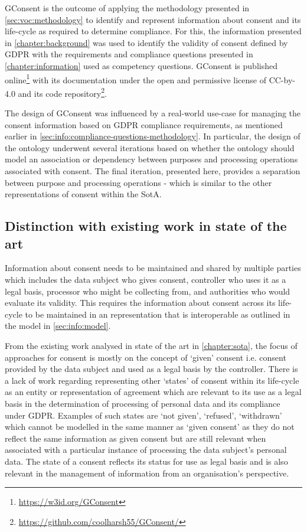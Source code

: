 GConsent is the outcome of applying the methodology presented in \autoref{sec:voc:methodology} to identify and represent information about consent and its life-cycle as required to determine compliance.
For this, the information presented in \autoref{chapter:background} was used to identify the validity of consent defined by GDPR with the requirements and compliance questions presented in \autoref{chapter:information} used as competency questions.
GConsent is published online\footnote{\url{https://w3id.org/GConsent}} with its documentation under the open and permissive license of CC-by-4.0 and its code repository\footnote{\url{https://github.com/coolharsh55/GConsent/}}.

The design of GConsent was influenced by a real-world use-case for managing the consent information based on GDPR compliance requirements, as mentioned earlier in \autoref{sec:info:compliance-questions-methodology}.
In particular, the design of the ontology underwent several iterations based on whether the ontology should model an association or dependency between purposes and processing operations associated with consent. The final iteration, presented here, provides a separation between purpose and processing operations - which is similar to the other representations of consent within the SotA.

\subsection{Distinction with existing work in state of the art}
Information about consent needs to be maintained and shared by multiple parties which includes the data subject who gives consent, controller who uses it as a legal basis, processor who might be collecting from, and authorities who would evaluate its validity. This requires the information about consent across its life-cycle to be maintained in an representation that is interoperable as outlined in the model in \autoref{sec:info:model}.

From the existing work analysed in state of the art in \autoref{chapter:sota}, the focus of approaches for consent is mostly on the concept of `given' consent i.e. consent provided by the data subject and used as a legal basis by the controller. There is a lack of work regarding representing other `states' of consent within its life-cycle as an entity or representation of agreement which are relevant to its use as a legal basis in the determination of processing of personal data and its compliance under GDPR.
Examples of such states are `not given', `refused', `withdrawn' which cannot be modelled in the same manner as `given consent' as they do not reflect the same information as given consent but are still relevant when associated with a particular instance of processing the data subject's personal data. The state of a consent reflects its status for use as legal basis and is also relevant in the management of information from an organisation's perspective.

